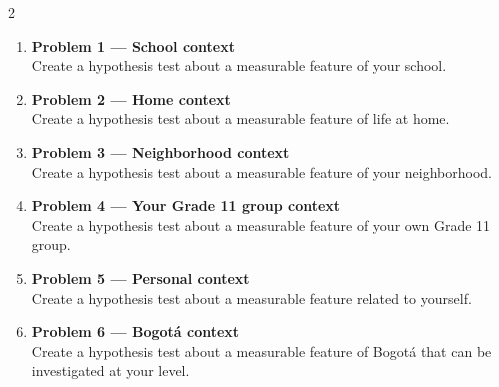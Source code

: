 \documentclass[12pt]{article}
\begin{document}
\begin{multicols}{2}
\begin{enumerate}
\item \textbf{Problem 1 --- School context}\\
Create a hypothesis test about a measurable feature of your school.

\item \textbf{Problem 2 --- Home context}\\
Create a hypothesis test about a measurable feature of life at home.

\item \textbf{Problem 3 --- Neighborhood context}\\
Create a hypothesis test about a measurable feature of your neighborhood.

\item \textbf{Problem 4 --- Your Grade 11 group context}\\
Create a hypothesis test about a measurable feature of your own Grade 11 group.

\item \textbf{Problem 5 --- Personal context}\\
Create a hypothesis test about a measurable feature related to yourself.

\item \textbf{Problem 6 --- Bogotá context}\\
Create a hypothesis test about a measurable feature of Bogotá that can be investigated at your level.
\end{enumerate}

\end{multicols}
\end{document}

